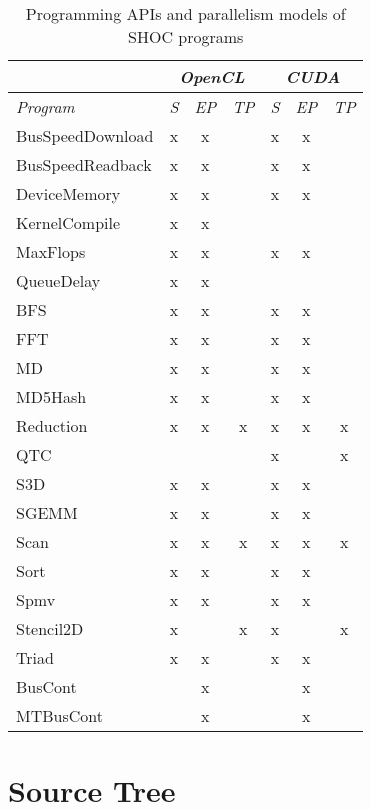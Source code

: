 \documentclass[11pt]{article}
\begin{document}
\begin{table}
\centering
\begin{tabular}{|l|c|c|c|c|c|c|}
\hline
 & \multicolumn{3}{c|}{\em OpenCL} & \multicolumn{3}{c|}{\em CUDA} \\
\hline
{\em Program} & {\em S} & {\em EP} & {\em TP} & {\em S} & {\em EP} & {\em TP} \\
\hline\hline
BusSpeedDownload    & x & x &   & x & x &   \\
BusSpeedReadback    & x & x &   & x & x &   \\
DeviceMemory        & x & x &   & x & x &   \\
KernelCompile       & x & x &   &   &   &   \\
MaxFlops            & x & x &   & x & x &   \\
QueueDelay          & x & x &   &   &   &   \\
BFS                 & x & x &   & x & x &   \\
FFT                 & x & x &   & x & x &   \\
MD                  & x & x &   & x & x &   \\
MD5Hash             & x & x &   & x & x &   \\
Reduction           & x & x & x & x & x & x \\
QTC                 &   &   &   & x &   & x \\
S3D                 & x & x &   & x & x &   \\
SGEMM               & x & x &   & x & x &   \\
Scan                & x & x & x & x & x & x \\
Sort                & x & x &   & x & x &   \\
Spmv                & x & x &   & x & x &   \\
Stencil2D           & x &   & x & x &   & x \\
Triad               & x & x &   & x & x &   \\
BusCont             &   & x &   &   & x &   \\
MTBusCont           &   & x &   &   & x &   \\
\hline
\end{tabular}
\caption{Programming APIs and parallelism models of SHOC programs}
\end{table}

\section{Source Tree}\label{sec:source}
\end{document}
